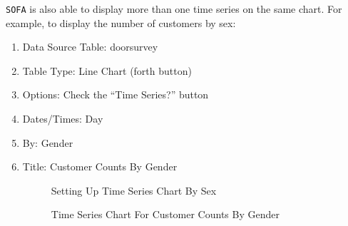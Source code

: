 \texttt{SOFA} is also able to display more than one time series on the same chart. For example, to display the number of customers by sex:

\begin{enumerate}
  \item Data Source Table: doorsurvey
  \item Table Type: Line Chart (forth button)
  \item Options: Check the ``Time Series?'' button
  \item Dates/Times: Day
  \item By: Gender
  \item Title: Customer Counts By Gender
  
  \begin{figure}[H]
    \begin{center}
      \caption{Setting Up Time Series Chart By Sex}
    \end{center}
  \end{figure}
  
  \begin{figure}[H]
    \begin{center}
      \caption{Time Series Chart For Customer Counts By Gender}
    \end{center}
  \end{figure}
\end{enumerate}

